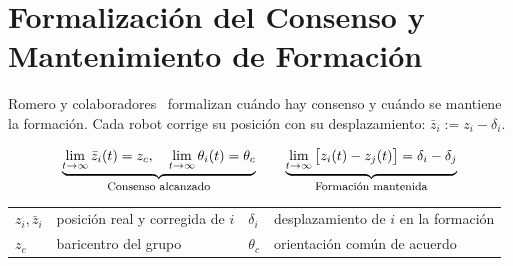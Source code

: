 \section{Formalización del Consenso y Mantenimiento de Formación}

Romero y colaboradores~\cite{romero2024global} formalizan cuándo hay consenso y cuándo se mantiene la formación. Cada robot corrige su posición con su desplazamiento: $\bar{z}_i := z_i - \delta_i$.

\begin{equation*}
    \underbrace{\lim_{t\to\infty} \bar{z}_i(t) = z_c, \quad \lim_{t\to\infty} \theta_i(t) = \theta_c}_{\text{\footnotesize Consenso alcanzado}}
    \qquad
    \underbrace{\lim_{t\to\infty} \big[z_i(t) - z_j(t)\big] = \delta_i - \delta_j}_{\text{\footnotesize Formación mantenida}}
\end{equation*}

{\footnotesize
\noindent
\begin{tabular}{l@{\ }l@{\qquad}l@{\ }l}
$z_i,\bar{z}_i$ & posición real y corregida de $i$ & $\delta_i$ & desplazamiento de $i$ en la formación \\
$z_c$ & baricentro del grupo & $\theta_c$ & orientación común de acuerdo \\
\end{tabular}
}
